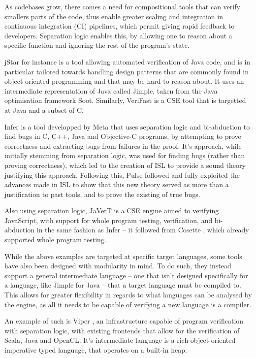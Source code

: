 As codebases grow, there comes a need for compositional tools that can verify smallers parts of the code, thus enable greater scaling and integration in continuous integration (CI) pipelines, which permit giving rapid feedback to developers. Separation logic enables this, by allowing one to reason about a specific function and ignoring the rest of the program's state.

jStar \cite{jstar} for instance is a tool allowing automated verification of Java code, and is in particular tailored towards handling design patterns that are commonly found in object-oriented programming and that may be hard to reason about. It uses an intermediate representation of Java called Jimple, taken from the Java optimisation framework Soot. Similarly, VeriFast \cite{verifast} is a CSE tool that is targetted at Java and a subset of C. 

Infer \cite{infer} is a tool developped by Meta that uses separation logic and bi-abduction to find bugs in C, C++, Java and Objective-C programs, by attempting to prove correctness and extracting bugs from failures in the proof. It's approach, while initially stemming from separation logic, was used for finding bugs (rather than proving correctness), which led to the creation of ISL \cite{isl} to provide a sound theory justifying this approach. Following this, Pulse \cite{pulse} followed and fully exploited the advances made in ISL to show that this new theory served as more than a justification to past tools, and to prove the existing of true bugs. 

Also using separation logic, JaVerT \cite{javert1, javert2} is a CSE engine aimed to verifying JavaScript, with support for whole program testing, verification, and bi-abduction in the same fashion as Infer -- it followed from Cosette \cite{cosette}, which already supported whole program testing.

While the above examples are targeted at specific target languages, some tools have also been designed with modularity in mind. To do such, they instead support a general intermediate language -- one that isn't designed specifically for a language, like Jimple for Java -- that a target language must be compiled to. This allows for greater flexibility in regards to what languages can be analysed by the engine, as all it needs to be capable of verifying a new language is a compiler. 

An example of such is Viper \cite{viper}, an infrastructure capable of program verification with separation logic, with existing frontends that allow for the verification of Scala, Java and OpenCL. It's intermediate language is a rich object-oriented imperative typed language, that operates on a built-in heap.

